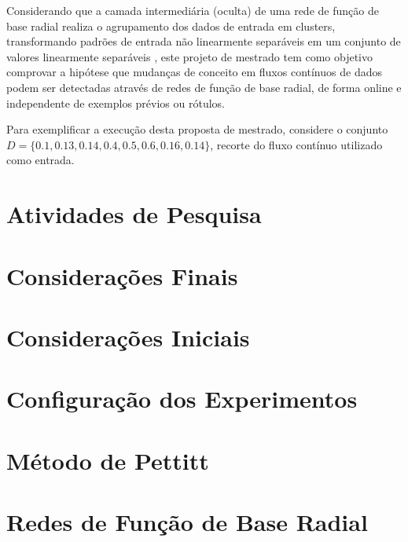 \documentclass[qual, classic, a4paper]{ufbathesis}
\begin{document}
Considerando que a camada intermediária (oculta) de uma rede de função de base radial realiza o agrupamento dos dados de entrada em clusters, 
transformando padrões de entrada não linearmente separáveis em um conjunto de valores linearmente separáveis \cite{Jianping:Venkateswarlu:RBF:SpeakerIdentification}, 
este projeto de mestrado tem como objetivo comprovar a hipótese que mudanças de conceito em fluxos contínuos de dados podem ser detectadas através de redes de função de base radial, de forma online e independente de exemplos prévios ou rótulos.

Para exemplificar a execução desta proposta de mestrado, considere o conjunto $D = \{0.1, 0.13, 0.14, 0.4, 0.5, 0.6, 0.16, 0.14\}$, recorte do fluxo contínuo utilizado como entrada.




\section{Atividades de Pesquisa}
\blindtext

\section{Considerações Finais}
\blindtext

 \label{experimentos_iniciais}
\section{Considerações Iniciais}
\blindtext

\section{Configuração dos Experimentos}
\blindtext

\section{Método de Pettitt}
\blindtext

\section{Redes de Função de Base Radial}
\blindtext
\end{document}

